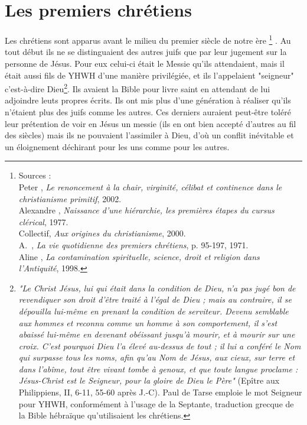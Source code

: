 


\chapter{Les premiers chrétiens}


 Les chrétiens sont apparus avant le milieu du premier siècle de notre ère%
\footnote{Sources :\\
Peter , \emph{Le renoncement à la chair, virginité, célibat et continence dans le christianisme primitif}, 2002.\\
Alexandre , \emph{Naissance d'une hiérarchie, les premières étapes du cursus clérical}, 1977.\\
Collectif, \emph{Aux origines du christianisme}, 2000.\\
A.~, \emph{La vie quotidienne des premiers chrétiens}, p. 95-197, 1971.\\
Aline , \emph{La contamination spirituelle, science, droit et religion dans l'Antiquité}, 1998.}%
. Au tout début ils ne se distinguaient des autres juifs que par leur jugement sur la personne de Jésus. Pour eux celui-ci était le Messie qu'ils attendaient, mais il était aussi fils de YHWH d'une manière privilégiée, et ils l'appelaient "seigneur" c'est-à-dire Dieu\footnote{\emph{"Le Christ Jésus, lui qui était dans la condition de Dieu, n'a pas jugé bon de revendiquer son droit d'être traité à l'égal de Dieu ; mais au contraire, il se dépouilla lui-même en prenant la condition de serviteur. Devenu semblable aux hommes et reconnu comme un homme à son comportement, il s'est abaissé lui-même en devenant obéissant jusqu'à mourir, et à mourir sur une croix. C'est pourquoi Dieu l'a élevé au-dessus de tout ; il lui a conféré le Nom qui surpasse tous les noms, afin qu'au Nom de Jésus, aux cieux, sur terre et dans l'abîme, tout être vivant tombe à genoux, et que toute langue proclame : Jésus-Christ est le Seigneur, pour la gloire de Dieu le Père"} (Epître aux Philippiens, II, 6-11, 55-60 après J.-C). Paul de Tarse emploie le mot Seigneur pour YHWH, conformément à l'usage de la Septante, traduction grecque de la Bible hébraïque qu'utilisaient les chrétiens. }. 
Ils avaient la Bible pour livre saint  en attendant de lui adjoindre leuts propres écrits. Ils ont mis plus d'une génération à réaliser qu'ils n'étaient plus des juifs comme les autres. Ces derniers auraient peut-être toléré leur prétention de voir en Jésus un messie (ils en ont bien accepté d'autres au fil des siècles) mais ils ne pouvaient l'assimiler à Dieu, d'où un conflit inévitable et un éloignement déchirant pour les uns comme pour les autres.



